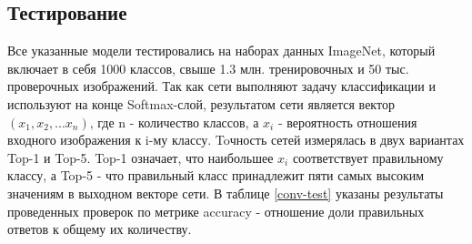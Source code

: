 

\subsection{Тестирование}
Все указанные модели тестировались на наборах данных ImageNet, который включает в себя 1000 классов, свыше 1.3 млн. тренировочных и 50 тыс. проверочных изображений. Так как сети выполняют задачу классификации и используют на конце Softmax-слой, результатом сети является вектор $(x_1,x_2,...x_n)$, где n - количество классов, а $x_i$ - вероятность отношения входного изображения к i-му классу. Toчность сетей измерялась в двух вариантах Top-1 и Top-5. Top-1 означает, что наибольшее $x_i$ соответствует правильному классу, а Top-5 - что правильный класс принадлежит пяти самых высоким значениям в выходном векторе сети. В таблице \ref{conv-test} указаны результаты проведенных проверок по метрике accuracy - отношение доли правильных ответов к общему их количеству. 


\clearpage